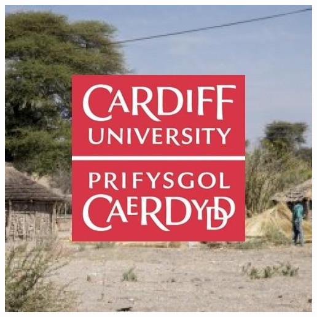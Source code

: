 \documentclass{beamer}
\begin{document}
\begin{frame}
\begin{columns}[T]
\begin{column}{.23\textwidth}
        \includegraphics[width=\textwidth]{static/phoenix-logo.jpg}
\end{column}%
\end{columns}
\end{frame}

\end{document}
